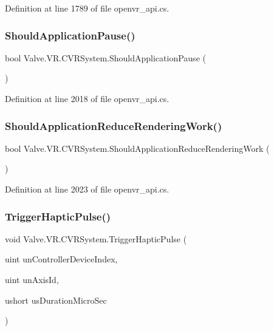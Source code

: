 Definition at line 1789 of file openvr\+\_\+api.\+cs.

\mbox{\label{class_valve_1_1_v_r_1_1_c_v_r_system_a5bdcaf6bcb7f5f0e2564033e5df476d9}} 
\subsubsection{\texorpdfstring{ShouldApplicationPause()}{ShouldApplicationPause()}}
{\footnotesize\ttfamily bool Valve.\+V\+R.\+C\+V\+R\+System.\+Should\+Application\+Pause (\begin{DoxyParamCaption}{ }\end{DoxyParamCaption})}



Definition at line 2018 of file openvr\+\_\+api.\+cs.

\mbox{\label{class_valve_1_1_v_r_1_1_c_v_r_system_a726687af31f242f9df5ea5a073150b8e}} 
\subsubsection{\texorpdfstring{ShouldApplicationReduceRenderingWork()}{ShouldApplicationReduceRenderingWork()}}
{\footnotesize\ttfamily bool Valve.\+V\+R.\+C\+V\+R\+System.\+Should\+Application\+Reduce\+Rendering\+Work (\begin{DoxyParamCaption}{ }\end{DoxyParamCaption})}



Definition at line 2023 of file openvr\+\_\+api.\+cs.

\mbox{\label{class_valve_1_1_v_r_1_1_c_v_r_system_a4fab070ac7de10c813b4d042a1d51fca}} 
\subsubsection{\texorpdfstring{TriggerHapticPulse()}{TriggerHapticPulse()}}
{\footnotesize\ttfamily void Valve.\+V\+R.\+C\+V\+R\+System.\+Trigger\+Haptic\+Pulse (\begin{DoxyParamCaption}\item[{uint}]{un\+Controller\+Device\+Index,  }\item[{uint}]{un\+Axis\+Id,  }\item[{ushort}]{us\+Duration\+Micro\+Sec }\end{DoxyParamCaption})}




